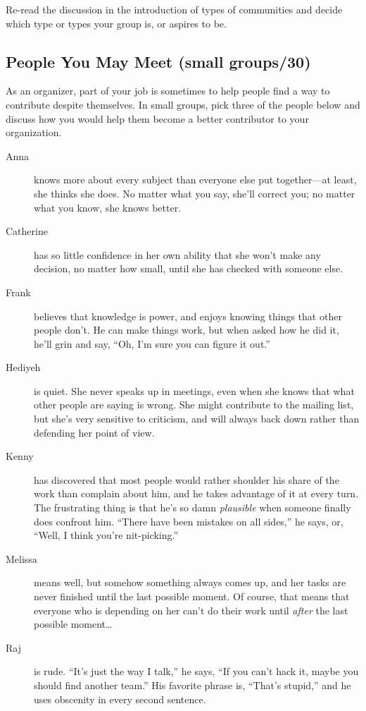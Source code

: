 Re-read the discussion in the introduction of types of communities and
decide which type or types your group is, or aspires to be.

\subsection*{People You May Meet (small groups/30)}

As an organizer, part of your job is sometimes to help people find a way
to contribute despite themselves. In small groups, pick three of the
people below and discuss how you would help them become a better
contributor to your organization.

\begin{description}
\item[Anna]
knows more about every subject than everyone else put together---at
least, she thinks she does. No matter what you say, she'll correct
you; no matter what you know, she knows better.
\item[Catherine]
has so little confidence in her own ability that she won't make any
decision, no matter how small, until she has checked with someone
else.
\item[Frank]
believes that knowledge is power, and enjoys knowing things that
other people don't. He can make things work, but when asked how he
did it, he'll grin and say, ``Oh, I'm sure you can figure it out.''
\item[Hediyeh]
is quiet. She never speaks up in meetings, even when she knows that
what other people are saying is wrong. She might contribute to the
mailing list, but she's very sensitive to criticism, and will always
back down rather than defending her point of view.
\item[Kenny]
has discovered that most people would rather shoulder his share of
the work than complain about him, and he takes advantage of it at
every turn. The frustrating thing is that he's so damn \emph{plausible}
when someone finally does confront him. ``There have been mistakes on
all sides,'' he says, or, ``Well, I think you're nit-picking.''
\item[Melissa]
means well, but somehow something always comes up, and her tasks are
never finished until the last possible moment. Of course, that means
that everyone who is depending on her can't do their work until
\emph{after} the last possible moment{\ldots}
\item[Raj]
is rude. ``It's just the way I talk,'' he says, ``If you can't hack it,
maybe you should find another team.'' His favorite phrase is, ``That's
stupid,'' and he uses obscenity in every second sentence.
\end{description}

